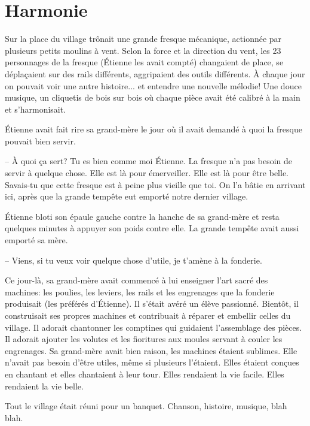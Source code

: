 \chapter{Harmonie}

Sur la place du village trônait une grande fresque mécanique, actionnée par
plusieurs petits moulins à vent.
%
Selon la force et la direction du vent, les 23 personnages de la fresque
(Étienne les avait compté) changaient de place, se déplaçaient sur des rails
différents, aggripaient des outils différents.  
%
À chaque jour on pouvait voir une autre histoire... et entendre une nouvelle
mélodie!  
%
Une douce musique, un cliquetis de bois sur bois où chaque pièce
avait été calibré à la main et s'harmonisait.

Étienne avait fait rire sa grand-mère le jour où il avait demandé à quoi la
fresque pouvait bien servir.

-- À quoi ça sert? Tu es bien comme moi Étienne. La fresque n'a pas besoin de
servir à quelque chose. Elle est là pour émerveiller. Elle est là pour être
belle. Savais-tu que cette fresque est à peine plus vieille que toi. On l'a
bâtie en arrivant ici, après que la grande tempête eut emporté 
notre dernier village.

Étienne bloti son épaule gauche contre la hanche de sa grand-mère
et resta quelques minutes à appuyer son poids contre elle.
%
La grande tempête avait aussi emporté sa mère.

-- Viens, si tu veux voir quelque chose d'utile, je t'amène à la fonderie.

Ce jour-là, sa grand-mère avait commencé à lui enseigner l'art sacré des
machines: les poulies, les leviers, les rails et les
engrenages que la fonderie produisait (les préférés d'Étienne).
%
Il s'était avéré un élève passionné.
%
Bientôt, il construisait ses propres machines et contribuait à réparer et
embellir celles du village.  
%
Il adorait chantonner les comptines qui guidaient
l'assemblage des pièces.  
%
Il adorait ajouter les volutes et les fioritures aux
moules servant à couler les engrenages. 
%
Sa grand-mère avait bien raison,
les machines étaient sublimes.  
%
Elle n'avait pas besoin d'être utiles, même si
plusieurs l'étaient.  
%
Elles étaient conçues en chantant et elles chantaient à leur tour.  
%
Elles rendaient la vie facile. 
%
Elles rendaient la
vie belle.

\sautSection{}

Tout le village était réuni pour un banquet. Chanson, histoire, musique, blah blah.

